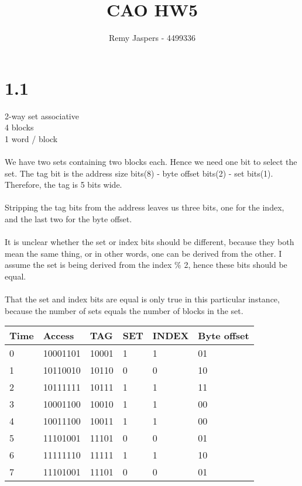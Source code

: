 \documentclass[10pt,a4paper]{article}
\author{Remy Jaspers - 4499336}
\title{CAO HW5}
\begin{document}
	\maketitle
	\section*{1.1}
	2-way set associative\\
	4 blocks\\
	1 word / block \\\\
	We have two sets containing two blocks each. Hence we need one bit to select the set. The tag bit is the address size bits(8) - byte offset bits(2) - set bits(1). Therefore, the tag is 5 bits wide.\\\\
	Stripping the tag bits from the address leaves us three bits, one for the index, and the last two for the byte offset.\\\\
	It is unclear whether the set or index bits should be different, because they both mean the same thing, or in other words, one can be derived from the other. I assume the set is being derived from the index \% 2, hence these bits should be equal. \\\\ That the set and index bits are equal is only true in this particular instance, because the number of sets equals the number of blocks in the set. 
\begin{table}[h]
	\centering
	\label{my-label}
	\begin{tabular}{|l|l|l|l|l|l|}
		\hline
		Time & Access  & TAG  & SET  & INDEX  & Byte offset  \\ \hline
		0& 10001101 & 10001 &  1  & 1 & 01\\ \hline
		1& 10110010 & 10110 &  0 & 0 &  10\\ \hline
		2& 10111111 & 10111 &  1 & 1& 11\\ \hline
		3& 10001100 & 10010 &  1 & 1 &00\\ \hline
		4& 10011100 & 10011 &  1 & 1 &00\\ \hline
		5& 11101001 & 11101 &  0 & 0 & 01\\ \hline
		6& 11111110 & 11111 &  1 & 1 & 10\\ \hline
		7& 11101001 & 11101 &  0 & 0 & 01\\ \hline
	\end{tabular}
\end{table}
\end{document}
